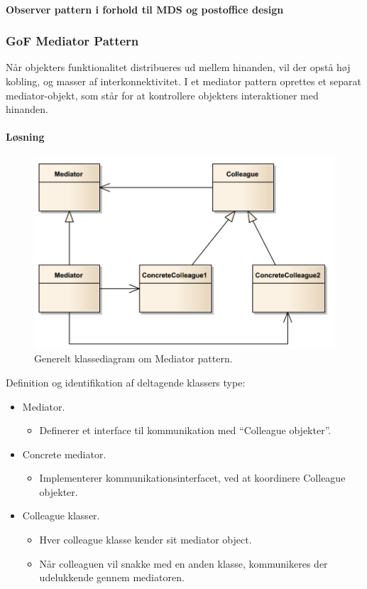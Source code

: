 \paragraph{Observer pattern i forhold til MDS og postoffice design}

\subsubsection{GoF Mediator Pattern}
Når objekters funktionalitet distribueres ud mellem hinanden, vil der opstå høj kobling, og masser af interkonnektivitet.  I et mediator pattern oprettes et separat mediator-objekt, som står for at kontrollere objekters interaktioner med hinanden. 

\paragraph{Løsning}

\begin{figure}[H]
	\centering
	\includegraphics[width=0.8\linewidth]{figs/spm5/concrete}
	\caption{Generelt klassediagram om Mediator pattern.}
	\label{fig:concrete}
\end{figure}

Definition og identifikation af deltagende klassers type:

\begin{itemize}
	\item Mediator.
	\begin{itemize}
		\item Definerer et interface til kommunikation med “Colleague objekter”.
	\end{itemize}
	\item Concrete mediator.
	\begin{itemize}
		\item 	Implementerer kommunikationsinterfacet, ved at koordinere Colleague objekter.
	\end{itemize}
	\item Colleague klasser.
	\begin{itemize}
		\item Hver colleague klasse kender sit mediator object.
		\item Når colleaguen vil snakke med en anden klasse, kommunikeres der udelukkende gennem mediatoren.
	\end{itemize}
\end{itemize}

